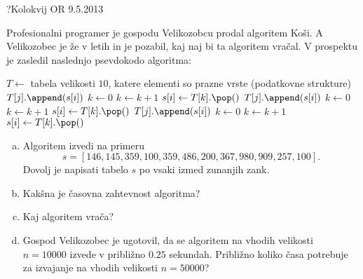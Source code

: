 \begin{naloga}{?}{Kolokvij OR 9.5.2013}
\begin{vprasanje}
Profesionalni programer je gospodu Velikozobcu prodal algoritem {\sc Koši}.
A Velikozobec je že v letih in je pozabil, kaj naj bi ta algoritem vračal.
V prospektu je zasledil naslednjo psevdokodo algoritma:
\begin{small}
\begin{algorithmic}
\State $T \gets$ tabela velikosti $10$,
    katere elementi so prazne vrste (podatkovne strukture)
            \State $T[j].\append(s[i])$
        \EndIf
    \EndFor
\EndFor
\State $k \gets 0$
        \State $k \gets k+1$
    \EndWhile
    \State $s[i] \gets T[k].\pop()$
\EndFor
{}
            \State $T[j].\append(s[i])$
        \EndIf
    \EndFor
\EndFor
\State $k \gets 0$
        \State $k \gets k+1$
    \EndWhile
    \State $s[i] \gets T[k].\pop()$
\EndFor
{}
            \State $T[j].\append(s[i])$
        \EndIf
    \EndFor
\EndFor
\State $k \gets 0$
        \State $k \gets k+1$
    \EndWhile
    \State $s[i] \gets T[k].\pop()$
\EndFor
\State {}
\end{algorithmic}
\end{small}

\begin{enumerate}[(a)]
\item Algoritem izvedi na primeru
$$
s = [146, 145, 359, 100, 359, 486, 200, 367, 980, 909, 257, 100] .
$$
Dovolj je napisati tabelo $s$ po vsaki izmed zunanjih zank.

\item Kakšna je časovna zahtevnost algoritma?

\item Kaj algoritem vrača?

\item Gospod Velikozobec je ugotovil,
da se algoritem na vhodih velikosti $n = 10000$
izvede v približno $0.25$ sekundah.
Približno koliko časa potrebuje za izvajanje na vhodih velikosti $n = 50000$?
\end{enumerate}
\end{vprasanje}
\begin{odgovor}
\end{odgovor}
\end{naloga}

